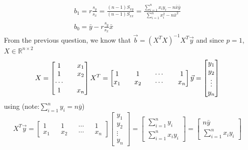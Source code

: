 \documentclass[12pt]{article}
\begin{document}
\begin{enumerate}
\begin{eqnarray}
b_1=r\frac{s_y}{s_x}=\frac{(n-1)S_{xy}}{(n-1)S_{xx}}=\frac{\sum\limits_{i=1}^nx_iy_i-n\bar{x}\bar{y}}{\sum\limits_{i=1}^nx_i^2-n\bar{x}^2}\\
b_0=\bar{y}-r\frac{s_y}{s_x}\bar{x}
\end{eqnarray}
 From the previous question, we know that $\vec{b}=(X^TX)^{-1}X^T\vec{y}$ and since $p=1$, $X\in\mathbb{R}^{n\times2}$ 
\begin{equation*}
X=\begin{bmatrix}1 && x_1\\1 && x_2\\\cdots\\1 && x_n\end{bmatrix}\\ 
X^T= \begin{bmatrix}1 && 1 && \cdots && 1\\x_1 && x_2 && \cdots && x_n\end{bmatrix} \\
\vec{y}=\begin{bmatrix}y_1\\y_2\\\vdots\\y_n\end{bmatrix}
\end{equation*}
using  (note:$\sum\limits_{i=1}^ny_i=n\bar{y}$) 
\begin{equation*}X^T\vec{y}=
\begin{bmatrix}1&&1&&\cdots&&1\\x_1&&x_2&&\cdots&&x_n\end{bmatrix}
\begin{bmatrix}y_1\\y_2\\\vdots\\y_n\end{bmatrix}=
\begin{bmatrix}\sum\limits_{i=1}^ny_i\\\sum\limits_{i=1}^nx_iy_i \end{bmatrix}=
\begin{bmatrix}n\bar{y}\\\sum\limits_{i=1}^nx_iy_i \end{bmatrix}
\end{equation*}


\end{enumerate}
\end{document}
